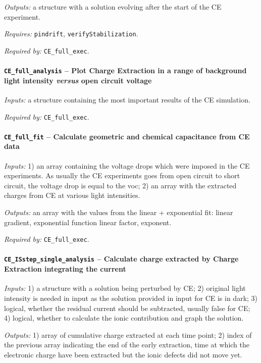 		\textit{Outputs:} a structure with a solution evolving after the start of the CE experiment.

		\textit{Requires:} \texttt{pin\-drift}, \texttt{verify\-Stabilization}.

		\textit{Required by:} \texttt{CE\_full\_exec}.


		\paragraph{\texttt{CE\_full\_analysis} -- Plot Charge Extraction in a range of background light intensity \textsl{versus} open circuit voltage}


		\textit{Inputs:} a structure containing the most important results of the CE simulation.

		\textit{Required by:} \texttt{CE\_full\_exec}.


		\paragraph{\texttt{CE\_full\_fit} -- Calculate geometric and chemical capacitance from CE data}

		\textit{Inputs:} 1) an array containing the voltage drops which were
		imposed in the CE experiments. As usually the CE experiments goes from
		open circuit to short circuit, the voltage drop is equal to the \gls{voc};
		2) an array with the extracted charges from CE at various light
		intensities.

		\textit{Outputs:} an array with the values from the linear + exponential fit:
		linear gradient, exponential function linear factor, exponent.


		\textit{Required by:} \texttt{CE\_full\_exec}.

		\paragraph{\texttt{CE\_ISstep\_single\_analysis} -- Calculate charge extracted by Charge Extraction integrating the current}

		\textit{Inputs:} 1) a structure with a solution being perturbed by CE;
		2) original light intensity is needed in input as the solution provided
		in input for CE is in dark;
		3) logical, whether the residual current should
		be subtracted, usually false for CE;
		4) logical, whether to calculate the ionic contribution and graph the solution.

		\textit{Outputs:} 1) array of cumulative charge extracted at each time point;
		2) index of the previous array indicating the end of the early extraction, time at which the electronic charge have been extracted but the ionic defects did not move yet.


